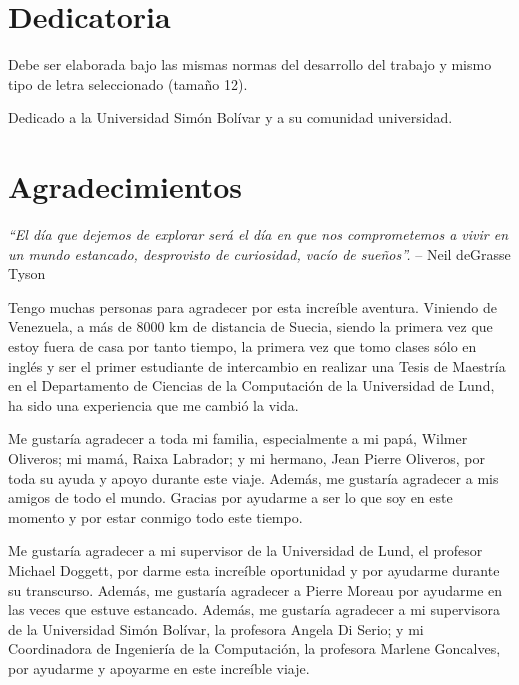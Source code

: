 \documentclass[pregrado]{tesis-usb} %
\begin{document}
\frontmatter
\maketitle
\chapter*{Dedicatoria}

Debe ser elaborada bajo las mismas normas del desarrollo del trabajo y mismo tipo de letra seleccionado (tama\~no 12).

\par Dedicado a la Universidad Sim\'on Bol\'ivar y a su comunidad universidad.

\chapter*{Agradecimientos}

\emph{“El día que dejemos de explorar será el día en que nos comprometemos a vivir en un mundo estancado, desprovisto de curiosidad, vacío de sueños”.}
– Neil deGrasse Tyson

Tengo muchas personas para agradecer por esta increíble aventura. Viniendo de Venezuela, a más de 8000 km de distancia de Suecia, siendo la primera vez que estoy fuera de casa por tanto tiempo, la primera vez que tomo clases sólo en inglés y ser el primer estudiante de intercambio en realizar una Tesis de Maestría en el Departamento de Ciencias de la Computación de la Universidad de Lund, ha sido una experiencia que me cambió la vida.

Me gustaría agradecer a toda mi familia, especialmente a mi papá, Wilmer Oliveros; mi mamá, Raixa Labrador; y mi hermano, Jean Pierre Oliveros, por toda su ayuda y apoyo durante este viaje. Además, me gustaría agradecer a mis amigos de todo el mundo. Gracias por ayudarme a ser lo que soy en este momento y por estar conmigo todo este tiempo.

Me gustaría agradecer a mi supervisor de la Universidad de Lund, el profesor Michael Doggett, por darme esta increíble oportunidad y por ayudarme durante su transcurso. Además, me gustaría agradecer a Pierre Moreau por ayudarme en las veces que estuve estancado.
Además, me gustaría agradecer a mi supervisora de la Universidad Simón Bolívar, la profesora Angela Di Serio; y mi Coordinadora de Ingeniería de la Computación, la profesora Marlene Goncalves, por ayudarme y apoyarme en este increíble viaje.
\end{document}

